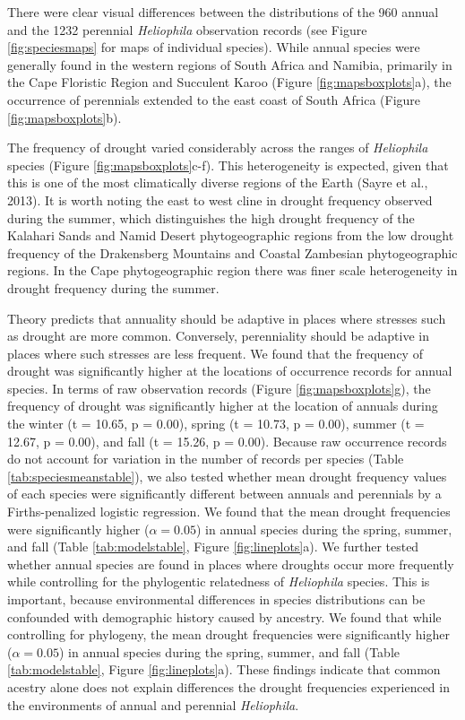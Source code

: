 \documentclass[man,floatsintext]{apa6}
\theoremstyle{definition}
\theoremstyle{definition}
\theoremstyle{definition}
\theoremstyle{remark}
\begin{document}
There were clear visual differences between the distributions of the 960
annual and the 1232 perennial \emph{Heliophila} observation records (see
Figure \ref{fig:speciesmaps} for maps of individual species). While
annual species were generally found in the western regions of South
Africa and Namibia, primarily in the Cape Floristic Region and Succulent
Karoo (Figure \ref{fig:mapsboxplots}a), the occurrence of perennials
extended to the east coast of South Africa (Figure
\ref{fig:mapsboxplots}b).

The frequency of drought varied considerably across the ranges of
\emph{Heliophila} species (Figure \ref{fig:mapsboxplots}c-f). This
heterogeneity is expected, given that this is one of the most
climatically diverse regions of the Earth (Sayre et al., 2013). It is
worth noting the east to west cline in drought frequency observed during
the summer, which distinguishes the high drought frequency of the
Kalahari Sands and Namid Desert phytogeographic regions from the low
drought frequency of the Drakensberg Mountains and Coastal Zambesian
phytogeographic regions. In the Cape phytogeographic region there was
finer scale heterogeneity in drought frequency during the summer.

Theory predicts that annuality should be adaptive in places where
stresses such as drought are more common. Conversely, perenniality
should be adaptive in places where such stresses are less frequent. We
found that the frequency of drought was significantly higher at the
locations of occurrence records for annual species. In terms of raw
observation records (Figure \ref{fig:mapsboxplots}g), the frequency of
drought was significantly higher at the location of annuals during the
winter (t = 10.65, p = 0.00), spring (t = 10.73, p = 0.00), summer (t =
12.67, p = 0.00), and fall (t = 15.26, p = 0.00). Because raw occurrence
records do not account for variation in the number of records per
species (Table \ref{tab:speciesmeanstable}), we also tested whether mean
drought frequency values of each species were significantly different
between annuals and perennials by a Firths-penalized logistic
regression. We found that the mean drought frequencies were
significantly higher (\(\alpha = 0.05\)) in annual species during the
spring, summer, and fall (Table \ref{tab:modelstable}, Figure
\ref{fig:lineplots}a). We further tested whether annual species are
found in places where droughts occur more frequently while controlling
for the phylogentic relatedness of \emph{Heliophila} species. This is
important, because environmental differences in species distributions
can be confounded with demographic history caused by ancestry. We found
that while controlling for phylogeny, the mean drought frequencies were
significantly higher (\(\alpha = 0.05\)) in annual species during the
spring, summer, and fall (Table \ref{tab:modelstable}, Figure
\ref{fig:lineplots}a). These findings indicate that common acestry alone
does not explain differences the drought frequencies experienced in the
environments of annual and perennial \emph{Heliophila}.
\end{document}
